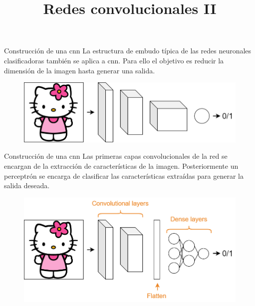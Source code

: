 



\title{Redes convolucionales II}


\maketitle

\begin{frame}{Construcción de una \gls{cnn}}
La estructura de \alert{embudo} típica de las redes neuronales \alert{clasificadoras} también se aplica a \gls{cnn}. Para ello el objetivo es \alert{reducir} la dimensión de la imagen hasta generar una salida.

\begin{figure}
    \centering
    \includegraphics[width=\textwidth]{figures/Tema 3/CNNEmbudo.png}
\end{figure}
\end{frame}

\begin{frame}{Construcción de una \gls{cnn}}
Las primeras capas \alert{convolucionales} de la red se encargan de la \alert{extracción de características} de la imagen. Posteriormente un \alert{perceptrón} se encarga de \alert{clasificar} las características extraídas para generar la \alert{salida deseada}.

\begin{figure}
    \centering
    \includegraphics[width=\textwidth]{figures/Tema 3/CNNPerceptron.png}
\end{figure}
\end{frame}

